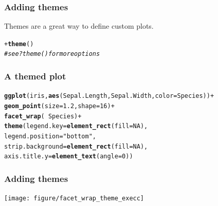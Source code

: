 \documentclass{beamer}\usepackage[]{graphicx}\usepackage[]{color}
\makeatletter
\newcommand{\hlstr}[1]{\textcolor[rgb]{0.192,0.494,0.8}{#1}}%
\newcommand{\hlcom}[1]{\textcolor[rgb]{0.678,0.584,0.686}{\textit{#1}}}%
\newcommand{\hlkwd}[1]{\textcolor[rgb]{0.737,0.353,0.396}{\textbf{#1}}}%
\newenvironment{kframe}{%
 \def\at@end@of@kframe{}%
 \ifinner\ifhmode%
  \def\at@end@of@kframe{\end{minipage}}%
  \begin{minipage}{\columnwidth}%
 \fi\fi%
 \def\FrameCommand##1{\hskip\@totalleftmargin \hskip-\fboxsep
 \colorbox{shadecolor}{##1}\hskip-\fboxsep
     \hskip-\linewidth \hskip-\@totalleftmargin \hskip\columnwidth}%
 \MakeFramed {\advance\hsize-\width
   \@totalleftmargin\z@ \linewidth\hsize
   \@setminipage}}%
 {\par\unskip\endMakeFramed%
 \at@end@of@kframe}
\newenvironment{knitrout}{}{} %
\makeatother
\begin{document}

\begin{frame}[fragile]
\frametitle{Adding themes}
Themes are a great way to define custom plots.
\begin{knitrout}\footnotesize
{}\color{fgcolor}\begin{kframe}
\begin{alltt}
+\hlkwd{theme}()
\hlcom{# see ?theme() for more options}
\end{alltt}
\end{kframe}
\end{knitrout}

\end{frame}


\begin{frame}[fragile]
\frametitle{A themed plot}
\begin{knitrout}\footnotesize
{}\color{fgcolor}\begin{kframe}
\begin{alltt}
\hlkwd{ggplot}(iris, \hlkwd{aes}(Sepal.Length, Sepal.Width, color = Species)) +
\hlkwd{geom_point}(size = 1.2, shape = 16) +
\hlkwd{facet_wrap}( ~ Species) +
\hlkwd{theme}(legend.key = \hlkwd{element_rect}(fill = NA),
legend.position = \hlstr{"bottom"},
strip.background = \hlkwd{element_rect}(fill = NA),
axis.title.y = \hlkwd{element_text}(angle = 0))
\end{alltt}
\end{kframe}
\end{knitrout}

\end{frame}


\begin{frame}[fragile]
\frametitle{Adding themes}
\begin{knitrout}\footnotesize
{}\color{fgcolor}
\texttt{[image: figure/facet\_wrap\_theme\_execc]} 

\end{knitrout}

\end{frame}
\end{document}
